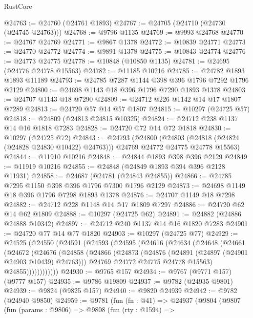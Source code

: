 \begin{lexlean}{RustCore}
\begin{coremodule}
@24763 := @24760 (@24761 @1893)
@24767 := @24705 (@24710 (@24730 (@24745 @24763)))
@24768 := @9796 @1135
@24769 := @9993 @24768
@24770 := @24767 @24769
@24771 := @9867 @1378
@24772 := @10839 @24771
@24773 := @24770 @24772
@24774 := @9891 @1378
@24775 := @10843 @24774
@24776 := @24773 @24775
@24778 := @10848 (@10850 @1135)
@24781 := @24695 (@24776 @24778 @15563)
@24782 := @11185 @10216
@24785 := @24782 @1893 @1893 @11189
@24793 := @24785 @7287 @1144 @398 @396 @1796 @7292 @1796 @2129
@24800 := @24698 @1143 @18 @396 @1796 @7290 @1893 @1378
@24803 := @24707 @1143 @18 @7290
@24809 := @24712 @226 @1142 @14 @17 @1807 @7289
@24813 := @24720 @57 @14 @57 @1807
@24815 := @10297 (@24725 @57)
@24818 := @24809 (@24813 @24815 @10325)
@24824 := @24712 @238 @1137 @14 @16 @1818 @7283
@24828 := @24720 @72 @14 @72 @1818
@24830 := @10297 (@24725 @72)
@24843 := @24793
    (@24800
      (@24803 (@24818 (@24824 (@24828 @24830 @10422) @24763)))
      @24769
      @24772
      @24775
      @24778
      @15563)
@24844 := @11910 @10216
@24848 := @24844 @1893 @398 @396 @2129
@24849 := @11919 @10216
@24855 := @24848 (@24849 @1893 @394 @396 @2128 @11931)
@24858 := @24687 (@24781 (@24843 @24855))
@24866 := @24785 @7295 @1150 @398 @396 @1796 @7300 @1796 @2129
@24873 := @24698 @1149 @18 @396 @1796 @7298 @1893 @1378
@24876 := @24707 @1149 @18 @7298
@24882 := @24712 @228 @1148 @14 @17 @1809 @7297
@24886 := @24720 @62 @14 @62 @1809
@24888 := @10297 (@24725 @62)
@24891 := @24882 (@24886 @24888 @10342)
@24897 := @24712 @240 @1137 @14 @16 @1820 @7283
@24901 := @24720 @77 @14 @77 @1820
@24903 := @10297 (@24725 @77)
@24929 := @24525
    (@24550
      (@24591
        (@24593
          (@24595
            (@24616
              (@24634
                (@24648
                  (@24661
                    (@24672
                      (@24676
                        (@24858
                          (@24866
                            (@24873
                              (@24876 (@24891 (@24897 (@24901 @24903 @10439) @24763)))
                              @24769
                              @24772
                              @24775
                              @24778
                              @15563)
                            @24855))))))))))))
@24930 := @9765 @157
@24934 := @9767 (@9771 @157) (@9777 @157)
@24935 := @9786 @19809
@24937 := @9782 (@24935 @9801)
@24939 := @9824 (@9825 @157)
@24940 := @9820 @24939
@24942 := @9782 (@24940 @9850)
@24959 := @9781
    (fun (fn : @41) =>
    @24937
      (@9804
        (@9807
          (fun (params : @9806) =>
          @9808
            (fun (rty : @1594) =>

\end{coremodule}
\end{lexlean}
